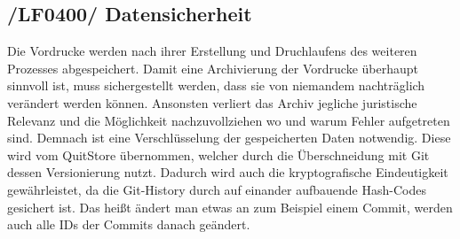 \subsection{/LF0400/ Datensicherheit}
Die Vordrucke werden nach ihrer Erstellung und Druchlaufens des weiteren Prozesses abgespeichert.
Damit eine Archivierung der Vordrucke überhaupt sinnvoll ist, muss sichergestellt werden, dass sie von niemandem  
nachträglich verändert werden können. Ansonsten verliert das Archiv jegliche juristische Relevanz und die Möglichkeit nachzuvollziehen wo und warum Fehler aufgetreten sind. Demnach ist eine Verschlüsselung der gespeicherten Daten notwendig. Diese wird vom QuitStore übernommen, welcher durch die Überschneidung mit Git dessen Versionierung nutzt. Dadurch wird auch die kryptografische Eindeutigkeit gewährleistet, da die Git-History durch auf einander aufbauende Hash-Codes gesichert ist. Das heißt ändert man etwas an zum Beispiel einem Commit, werden auch alle IDs der Commits danach geändert.